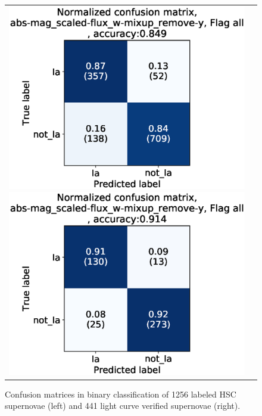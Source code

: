 \documentclass[useamsfonts]{pasj01}
\begin{document}
\begin{figure}[ht]
    \begin{tabular}{cc}
        \begin{minipage}{0.5\hsize}
            \begin{center}
                \includegraphics[width=\columnwidth]{figures/10_CM_abs-mag_scaled-flux_w-mixup_remove-y_predictions_test_2_Flagall_all.eps}
            \end{center}
        \end{minipage}
        \begin{minipage}{0.5\hsize}
            \begin{center}
                \includegraphics[width=\columnwidth]{figures/10_CM_abs-mag_scaled-flux_w-mixup_remove-y_predictions_test_2_Flagall_noedge_spec.eps}
            \end{center}
        \end{minipage}
    \end{tabular}
    \caption{%
  Confusion matrices in binary classification of 1256 labeled HSC supernovae (left) and 441 light curve verified supernovae (right).
}%
    \label{fig:h2_test_CM}
\end{figure}
%
%
\end{document}
